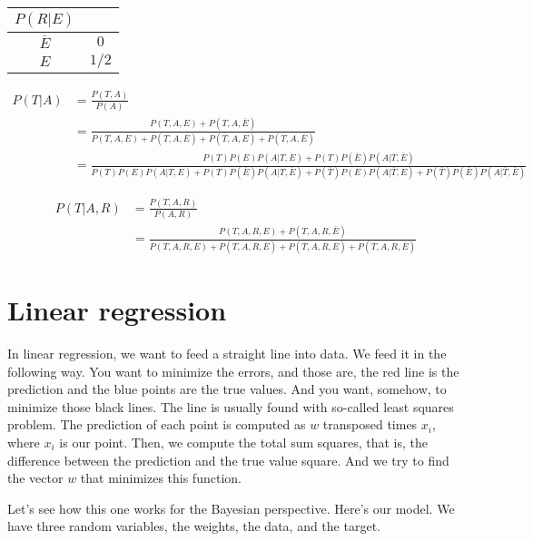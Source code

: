 \documentclass{book}
\begin{document}
\begin{center}
\begin{tabular}{|| c | c ||}
 \hline
 $P(R \vert E)$ & \\ 
 \hline\hline
 $\overline{E}$ & $0$ \\  
 $E$ & $1/2$ \\ 
 \hline
\end{tabular}
\end{center}

\begin{align*}
P(T \vert A) &= \frac{P(T, A)}{P(A)} \\
&= \frac{P(T, A, E) + P(T, A, \overline{E})}{P(T, A, E) + P(T, A, \overline{E}) + P(\overline{T}, A, E) + P(\overline{T}, A, \overline{E})} \\
&= \frac{P(T)P(E)P(A \vert T,E) + P(T)P(\overline{E})P(A \vert T,\overline{E})}
{P(T)P(E)P(A \vert T,E) + P(T)P(\overline{E})P(A \vert T,\overline{E}) + P(\overline{T})P(E)P(A \vert \overline{T},E) + P(\overline{T})P(\overline{E})P(A \vert \overline{T},\overline{E})}
\end{align*}

\begin{align*}
P(T \vert A, R) &= \frac{P(T, A, R)}{P(A, R)} \\
&= \frac{P(T, A, R, E) + P(T, A, R, \overline{E})}{P(T, A, R, E) + P(T, A, R, \overline{E}) + P(\overline{T}, A, R, E) + P(\overline{T}, A, R, \overline{E})}
\end{align*}

\section{Linear regression}
In linear regression, we want to feed a straight line into data. We feed it in the following way. You want to minimize the errors, and those are, the red line is the prediction and the blue points are the true values. And you want, somehow, to minimize those black lines. The line is usually found with so-called least squares problem. The prediction of each point is computed as $w$ transposed times $x_i$, where $x_i$ is our point. Then, we compute the total sum squares, that is, the difference between the prediction and the true value square. And we try to find the vector $w$ that minimizes this function. 

Let's see how this one works for the Bayesian perspective. Here's our model. We have three random variables, the weights, the data, and the target.
\begin{figure}[h]
\centering
{}
\end{figure}
\end{document}
